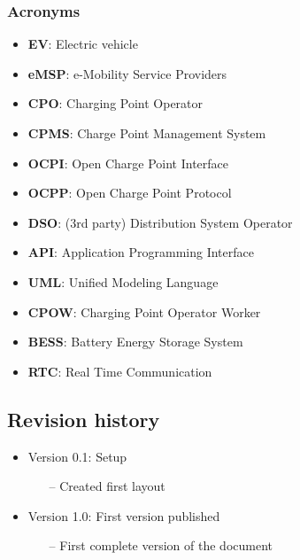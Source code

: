 \documentclass[table, 12pt]{article} %
\begin{document}
    \subsubsection*{Acronyms}
        \begin{itemize}
            \item \textbf{EV}: Electric vehicle
            \item \textbf{eMSP}: e-Mobility Service Providers
            \item \textbf{CPO}: Charging Point Operator
            \item \textbf{CPMS}: Charge Point Management System
            \item \textbf{OCPI}: Open Charge Point Interface
            \item \textbf{OCPP}: Open Charge Point Protocol
            \item \textbf{DSO}: (3rd party) Distribution System Operator
            \item \textbf{API}: Application Programming Interface
            \item \textbf{UML}: Unified Modeling Language
            \item \textbf{CPOW}: Charging Point Operator Worker
            \item \textbf{BESS}: Battery Energy Storage System
            \item \textbf{RTC}: Real Time Communication
        \end{itemize}

    \newpage
    \subsection{Revision history}
        \begin{itemize}
            \item Version 0.1: Setup
            \begin{itemize}
                \item[--] Created first layout
            \end{itemize}
        \end{itemize}

        \begin{itemize}
            \item Version 1.0: First version published
            \begin{itemize}
                \item[--] First complete version of the document
            \end{itemize}
        \end{itemize}
\end{document}

